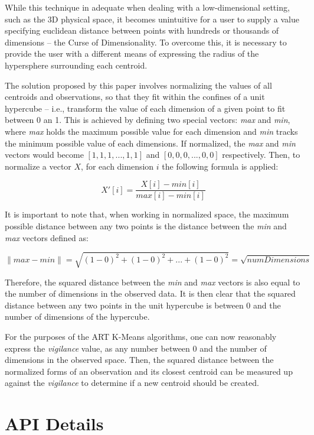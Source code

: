\documentclass{l4proj}
\begin{document}
While this technique in adequate when dealing with a low-dimensional setting, such as the 3D physical space, it becomes unintuitive for a user to supply a value specifying euclidean distance between points with hundreds or thousands of dimensions -- the Curse of Dimensionality\cite{CurseOfDimensionality}. To overcome this, it is necessary to provide the user with a different means of expressing the radius of the hypersphere surrounding each centroid.

The solution proposed by this paper involves normalizing the values of all centroids and observations, so that they fit within the confines of a unit hypercube -- i.e., transform the value of each dimension of a given point to fit between 0 an 1. This is achieved by defining two special vectors: \textit{max} and \textit{min}, where \textit{max} holds the maximum possible value for each dimension and \textit{min} tracks the minimum possible value of each dimensions. If normalized, the \textit{max} and \textit{min} vectors would become $[1, 1, 1, ..., 1, 1]$ and $[0, 0, 0, ..., 0, 0]$ respectively. Then, to normalize a vector $X$, for each dimension $i$ the following formula is applied:

$$X'[i] = \frac{X[i] - min[i]}{max[i] - min[i]}$$

It is important to note that, when working in normalized space, the maximum possible distance between any two points is the distance between the \textit{min} and \textit{max} vectors defined as:

$$\|max - min\| = \sqrt{(1-0)^2 + (1-0)^2 + ... + (1-0)^2} = \sqrt{numDimensions}$$

\noindent Therefore, the squared distance between the \textit{min} and \textit{max} vectors is also equal to the number of dimensions in the observed data. It is then clear that the squared distance between any two points in the unit hypercube is between 0 and the number of dimensions of the hypercube. 

For the purposes of the ART K-Means algorithms, one can now reasonably express the \textit{vigilance} value, as any number between 0 and the number of dimensions in the observed space. Then, the squared distance between the normalized forms of an observation and its closest centroid can be measured up against the \textit{vigilance} to determine if a new centroid should be created.

\section{API Details}
\end{document}

